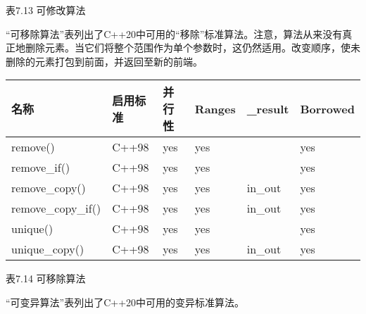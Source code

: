 \begin{center}
表7.13 可修改算法
\end{center}

“可移除算法”表列出了C++20中可用的“移除”标准算法。注意，算法从来没有真正地删除元素。当它们将整个范围作为单个参数时，这仍然适用。改变顺序，使未删除的元素打包到前面，并返回至新的前端。


\begin{longtable}[c]{|l|l|l|l|l|l|}
\hline
\textbf{名称} & \textbf{启用标准} & \textbf{并行性} & \textbf{Ranges} & \textbf{\_result} & \textbf{Borrowed} \\ \hline
\endfirsthead
%
\endhead
%
remove()           & C++98 & yes & yes &         & yes \\ \hline
remove\_if()       & C++98 & yes & yes &         & yes \\ \hline
remove\_copy()     & C++98 & yes & yes & in\_out & yes \\ \hline
remove\_copy\_if() & C++98 & yes & yes & in\_out & yes \\ \hline
unique()           & C++98 & yes & yes &         & yes \\ \hline
unique\_copy()     & C++98 & yes & yes & in\_out & yes \\ \hline
\end{longtable}

\begin{center}
表7.14 可移除算法
\end{center}

“可变异算法”表列出了C++20中可用的变异标准算法。

